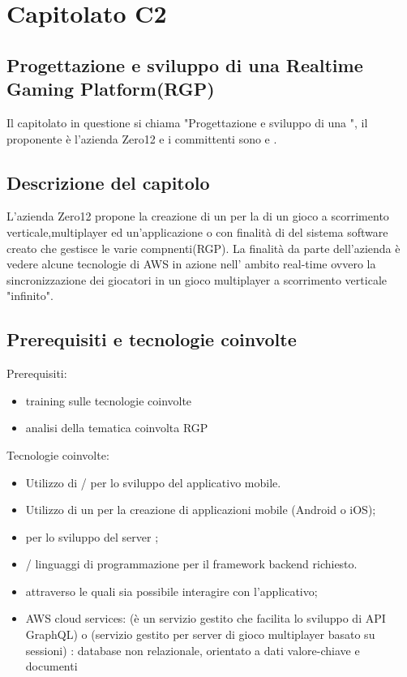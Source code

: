 \section{Capitolato C2}
\subsection{Progettazione e sviluppo di una Realtime Gaming Platform(RGP)}
Il capitolato in questione si chiama "Progettazione e sviluppo di una ", il proponente è l'azienda Zero12 e i committenti sono \VT{} e \CR{}.

\subsection{Descrizione del capitolo}
L’azienda Zero12 propone la creazione di un  per la  di un gioco a scorrimento verticale,multiplayer ed un'applicazione  o  con finalità di  del sistema software creato che gestisce le varie compnenti(RGP).
La finalità da parte dell’azienda è vedere alcune tecnologie di AWS in azione nell' ambito real-time ovvero la sincronizzazione dei giocatori in un gioco multiplayer a scorrimento verticale "infinito".
\subsection{Prerequisiti e tecnologie coinvolte}
Prerequisiti:
\begin{itemize}
\item training sulle tecnologie coinvolte
\item analisi della tematica coinvolta RGP 
\end{itemize}
Tecnologie coinvolte:
\begin{itemize}
\item Utilizzo di / per lo sviluppo del applicativo mobile.
\item Utilizzo di un  per la creazione di applicazioni mobile (Android o iOS);
\item {} per lo sviluppo del server ;
\item {}/ linguaggi di programmazione per il framework backend richiesto.
\item {}  attraverso le quali sia possibile interagire con l'applicativo;
\item AWS cloud services: 
(è un servizio gestito che facilita lo sviluppo di API GraphQL) o (servizio gestito per server di gioco multiplayer basato su sessioni) 
: database non relazionale, orientato a dati valore-chiave e documenti
\end{itemize}

